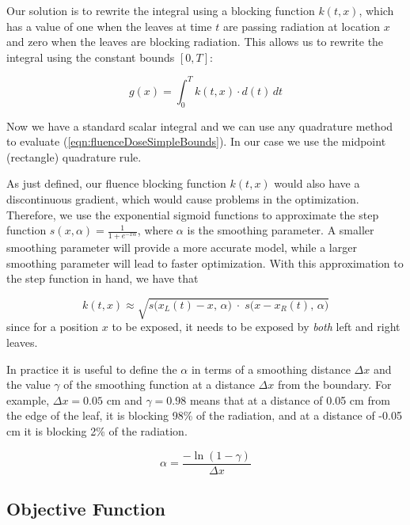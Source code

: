 \documentclass[12pt]{article}
\begin{document}
Our solution is to rewrite the integral using a blocking function $k(t,x)$, which has a value of one when the leaves at time $t$ are passing radiation at location $x$ and zero when the leaves are blocking radiation. This allows us to rewrite the integral using the constant bounds $[0, T]$:

\begin{equation}
  g(x) = \int_0^T \! k(t, x) \cdot d(t) \, dt
  \label{eqn:fluenceDoseSimpleBounds}
\end{equation}

Now we have a standard scalar integral and we can use any quadrature method to evaluate (\ref{eqn:fluenceDoseSimpleBounds}).
In our case we use the midpoint (rectangle) quadrature rule.

As just defined, our fluence blocking function $k(t,x)$
would also have a discontinuous gradient, which would cause problems in the optimization.
Therefore, we use the exponential sigmoid functions to approximate the step function
$s(x, \alpha) = \frac{1}{1 + e^{-x \alpha}}$, where $\alpha$ is the smoothing parameter. A smaller smoothing parameter will provide a more accurate model, while a larger smoothing parameter will lead to faster optimization. With this approximation to the step function in hand, we have that

\begin{equation}
  k(t, x) \approx \sqrt{s\big(x_L(t) -x, \, \alpha\big) \; \cdot \; s\big(x -x_R(t), \, \alpha\big)}
\end{equation}
since for a position $x$ to be exposed, it needs to be exposed by {\em both} left and right leaves.

In practice it is useful to define the $\alpha$ in terms of a smoothing distance $\Delta x$ and the
value $\gamma$ of the smoothing function at a distance $\Delta x$ from the boundary. For example, $\Delta x = 0.05$ cm and $\gamma = 0.98$ means that at a distance of 0.05 cm from the edge of the leaf, it is blocking 98\% of the radiation, and at a distance of -0.05 cm it is blocking 2\% of the radiation.

\begin{equation}
  \alpha = \frac{-\ln(1-\gamma)}{\Delta x}
  \label{eqn:SmoothingDistanceParameter}
\end{equation}

\subsection{Objective Function}
\end{document}
